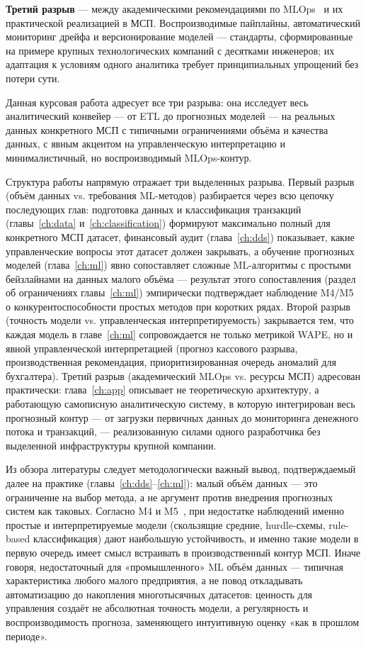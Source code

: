 \textbf{Третий разрыв} --- между академическими рекомендациями по MLOps~\cite{sculley2015hidden} и их практической реализацией в МСП. Воспроизводимые пайплайны, автоматический мониторинг дрейфа и версионирование моделей --- стандарты, сформированные на примере крупных технологических компаний с десятками инженеров; их адаптация к условиям одного аналитика требует принципиальных упрощений без потери сути.

Данная курсовая работа адресует все три разрыва: она исследует весь аналитический конвейер --- от ETL до прогнозных моделей --- на реальных данных конкретного МСП с типичными ограничениями объёма и качества данных, с явным акцентом на управленческую интерпретацию и минималистичный, но воспроизводимый MLOps-контур.

Структура работы напрямую отражает три выделенных разрыва. Первый разрыв (объём данных vs. требования ML-методов) разбирается через всю цепочку последующих глав: подготовка данных и классификация транзакций (главы~\ref{ch:data} и~\ref{ch:classification}) формируют максимально полный для конкретного МСП датасет, финансовый аудит (глава~\ref{ch:dds}) показывает, какие управленческие вопросы этот датасет должен закрывать, а обучение прогнозных моделей (глава~\ref{ch:ml}) явно сопоставляет сложные ML-алгоритмы с простыми бейзлайнами на данных малого объёма --- результат этого сопоставления (раздел об ограничениях главы~\ref{ch:ml}) эмпирически подтверждает наблюдение M4/M5~\cite{makridakis2018m4,makridakis2022m5} о конкурентоспособности простых методов при коротких рядах. Второй разрыв (точность модели vs. управленческая интерпретируемость) закрывается тем, что каждая модель в главе~\ref{ch:ml} сопровождается не только метрикой WAPE, но и явной управленческой интерпретацией (прогноз кассового разрыва, производственная рекомендация, приоритизированная очередь аномалий для бухгалтера). Третий разрыв (академический MLOps vs. ресурсы МСП) адресован практически: глава~\ref{ch:app} описывает не теоретическую архитектуру, а работающую самописную аналитическую систему, в которую интегрирован весь прогнозный контур --- от загрузки первичных данных до мониторинга денежного потока и транзакций, --- реализованную силами одного разработчика без выделенной инфраструктуры крупной компании.

Из обзора литературы следует методологически важный вывод, подтверждаемый далее на практике (главы~\ref{ch:dds}--\ref{ch:ml}): малый объём данных --- это ограничение на выбор метода, а не аргумент против внедрения прогнозных систем как таковых. Согласно M4 и M5~\cite{makridakis2018m4,makridakis2022m5}, при недостатке наблюдений именно простые и интерпретируемые модели (скользящие средние, hurdle-схемы, rule-based классификация) дают наибольшую устойчивость, и именно такие модели в первую очередь имеет смысл встраивать в производственный контур МСП. Иначе говоря, недостаточный для «промышленного» ML объём данных --- типичная характеристика любого малого предприятия, а не повод откладывать автоматизацию до накопления многотысячных датасетов: ценность для управления создаёт не абсолютная точность модели, а регулярность и воспроизводимость прогноза, заменяющего интуитивную оценку «как в прошлом периоде».
